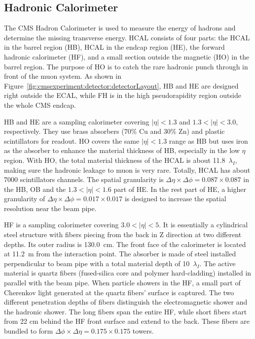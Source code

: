\subsection{Hadronic Calorimeter}
The CMS Hadron Calorimeter \cite{cms:hcalTdrCMS:1997xji} is used to measure the energy of hadrons and determine the missing transverse energy. HCAL consists of four parts: the HCAL in the barrel region (HB), HCAL in the endcap region (HE), the forward hadronic calorimeter (HF), and a small section outside the magnetic (HO) in the barrel region. The purpose of HO is to catch the rare hadronic punch through in front of the muon system. As shown in Figure~\ref{fig:cmsexperiment:detector:detectorLayout}, HB and HE are designed right outside the ECAL, while FH is in the high pseudorapidity region outside the whole CMS endcap.

HB and HE are a sampling calorimeter covering $|\eta|< 1.3$ and $1.3<|\eta|< 3.0$, respectively. They use brass absorbers ($70\%$ Cu and $30\%$ Zn) and plastic scintillators for readout. HO covers the same $|\eta|< 1.3$ range as HB but uses iron as the absorber to enhance the material thickness of HB, especially in the low $\eta$ region. With HO, the total material thickness of the HCAL is about 11.8~$\lambda_I$, making sure the hadronic leakage to muon is very rare. Totally, HCAL has about 7000 scintillators channels. The spatial granularity is $\Delta \eta \times \Delta \phi = 0.087 \times 0.087$ in the HB, OB and the $1.3<|\eta|< 1.6$ part of HE. In the rest part of HE, a higher granularity of $\Delta \eta \times \Delta \phi = 0.017 \times 0.017$ is designed to increase the spatial resolution near the beam pipe.

HF is a sampling calorimeter covering $3.0 < |\eta| < 5$. It is essentially a cylindrical steel structure with fibers piecing from the back in Z direction at two different depths. Its outer radius is 130.0~cm. The front face of the calorimeter is located at 11.2~m from the interaction point. The absorber is made of steel installed perpendicular to beam pipe with a total material depth of 10~$\lambda_I$. The active material is quartz fibers (fused-silica core and polymer hard-cladding) installed in parallel with the beam pipe. When particle showers in the HF, a small part of Cherenkov light generated at the quartz fibers' surface is captured. The two different penetration depths of fibers distinguish the electromagnetic shower and the hadronic shower. The long fibers span the entire HF, while short fibers start from 22 cm behind the HF front surface and extend to the back. These fibers are bundled to form $\Delta \phi \times \Delta \eta = 0.175 \times 0.175$ towers. 


